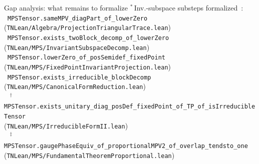 \documentclass[aspectratio=169,10pt]{beamer}
\begin{document}
\begin{frame}{Gap analysis: what remains to formalize}
    \vspace{0.15em}
    {\footnotesize\textcolor{leangreen}{%
        $^*$\,Inv.-subspace substeps formalized~\cite{Cirac2017Annals,Perez-Garcia2007Matrix}:\\
        \textcolor{leangreen}{\checkmark}~\texttt{MPSTensor.sameMPV\_diagPart\_of\_lowerZero}
          (\texttt{TNLean/Algebra/ProjectionTriangularTrace.lean})\\
        \textcolor{leangreen}{\checkmark}~\texttt{MPSTensor.exists\_twoBlock\_decomp\_of\_lowerZero}
          (\texttt{TNLean/MPS/InvariantSubspaceDecomp.lean})\\[0.15em]
        \textcolor{leangreen}{\checkmark}~\texttt{MPSTensor.lowerZero\_of\_posSemidef\_fixedPoint}
          (\texttt{TNLean/MPS/FixedPointInvariantProjection.lean})\\[0.15em]
        \textcolor{leangreen}{\checkmark}~\texttt{MPSTensor.exists\_irreducible\_blockDecomp}
          (\texttt{TNLean/MPS/CanonicalFormReduction.lean})~\cite{Cirac2017Annals,Cirac2017Irreducible}\\[0.15em]
        \textcolor{leangreen}{\checkmark}~%
          $^{\dagger}$\,\texttt{MPSTensor.exists\_unitary\_diag\_posDef\_fixedPoint\_of\_TP\_of\_isIrreducibleTensor}\\
          \quad(\texttt{TNLean/MPS/IrreducibleFormII.lean})~\cite{Cirac2017Annals,Cirac2017Irreducible}\\[0.15em]
        \textcolor{leangreen}{\checkmark}~%
          $^{\ddagger}$\,\texttt{MPSTensor.gaugePhaseEquiv\_of\_proportionalMPV2\_of\_overlap\_tendsto\_one}\\
          \quad(\texttt{TNLean/MPS/FundamentalTheoremProportional.lean})~\cite{Cirac2021Matrix}\\[0.15em]
}}
\end{frame}
\end{document}
